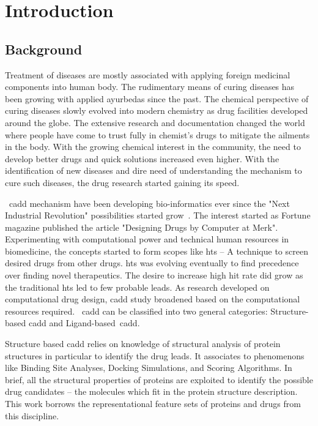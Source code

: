 \setcounter{page}{1}
\chapter{Introduction}
\section{Background}
Treatment of diseases are mostly associated with applying foreign medicinal components into human body. The rudimentary means of curing diseases has been growing with applied ayurbedas since the past. The chemical perspective of curing diseases slowly evolved into modern chemistry as drug facilities developed around the globe. The extensive research and documentation changed the world where people have come to trust fully in chemist's drugs to mitigate the ailments in the body. With the growing chemical interest in the community, the need to develop better drugs and quick solutions increased even higher. With the identification of new diseases and dire need of understanding the mechanism to cure such diseases, the drug research started gaining its speed.

~\acrfull{cadd} mechanism have been developing bio-informatics ever since the "Next Industrial Revolution" possibilities started grow~\citep{Leelananda2016,Brown2017}. The interest started as Fortune magazine published the article "Designing Drugs by Computer at Merk". Experimenting with computational power and technical human resources in biomedicine, the concepts started to form scopes like \acrfull{hts} -- A technique to screen desired drugs from other drugs. \acrshort{hts} was evolving eventually to find precedence over finding novel therapeutics. The desire to increase high hit rate did grow as the traditional \acrshort{hts} led to few probable leads. As research developed on computational drug design, \acrshort{cadd} study broadened based on the computational resources required. ~\acrshort{cadd} can be classified into two general categories: Structure-based \acrshort{cadd} and Ligand-based~\acrshort{cadd}.

Structure based \acrshort{cadd} relies on knowledge of structural analysis of protein structures in particular to identify the drug leads. It associates to phenomenons like Binding Site Analyses, Docking Simulations, and Scoring Algorithms. In brief, all the structural properties of proteins are exploited to identify the possible drug candidates -- the molecules which fit in the protein structure description. This work borrows the representational feature sets of proteins and drugs from this discipline.

